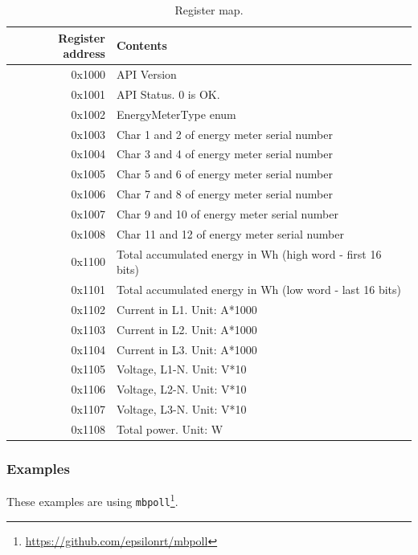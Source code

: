 \documentclass{scrartcl}
\begin{document}
\begin{table}[h!]
  \begin{center}
    \caption{Register map.}
    \label{tab:register-map}
    \begin{tabular}{r|l}
      \toprule
      \textbf{Register address} & \textbf{Contents} \\
      \midrule
      0x1000 & API Version \\
      0x1001 & API Status. 0 is OK. \\
      0x1002 & EnergyMeterType enum \\
      0x1003 & Char 1 and 2 of energy meter serial number \\
      0x1004 & Char 3 and 4 of energy meter serial number \\
      0x1005 & Char 5 and 6 of energy meter serial number \\
      0x1006 & Char 7 and 8 of energy meter serial number \\
      0x1007 & Char 9 and 10 of energy meter serial number \\
      0x1008 & Char 11 and 12 of energy meter serial number \\
      \midrule
      0x1100 & Total accumulated energy in Wh (high word - first 16 bits) \\
      0x1101 & Total accumulated energy in Wh (low word - last 16 bits) \\
      0x1102 & Current in L1. Unit: A*1000 \\
      0x1103 & Current in L2. Unit: A*1000 \\
      0x1104 & Current in L3. Unit: A*1000 \\
      0x1105 & Voltage, L1-N. Unit: V*10 \\
      0x1106 & Voltage, L2-N. Unit: V*10 \\
      0x1107 & Voltage, L3-N. Unit: V*10 \\
      0x1108 & Total power. Unit: W \\
      \bottomrule
    \end{tabular}
  \end{center}
\end{table}


\subsubsection{Examples}
\label{sec:examples}

These examples are using
\verb|mbpoll|\footnote{\url{https://github.com/epsilonrt/mbpoll}}.
\end{document}
